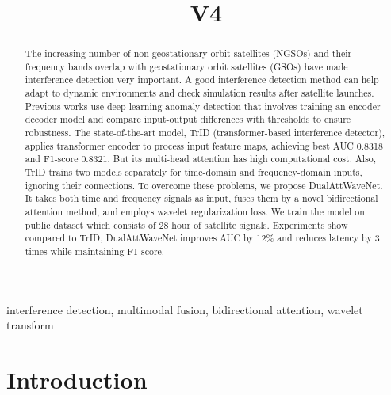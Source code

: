 \documentclass[conference]{IEEEtran}
\begin{document}
\title{V4}

\author{
}

\maketitle

\begin{abstract}
    The increasing number of non-geostationary orbit satellites (NGSOs) and their frequency bands overlap with geostationary orbit satellites (GSOs) have made interference detection very important. A good interference detection method can help adapt to dynamic environments and check simulation results after satellite launches. Previous works use deep learning anomaly detection that involves training an encoder-decoder model and compare input-output differences with thresholds to ensure robustness. The state-of-the-art model, TrID (transformer-based interference detector), applies transformer encoder to process input feature maps, achieving best AUC 0.8318 and F1-score 0.8321. But its multi-head attention has high computational cost. Also, TrID trains two models separately for time-domain and frequency-domain inputs, ignoring their connections. To overcome these problems, we propose DualAttWaveNet. It takes both time and frequency signals as input, fuses them by a novel bidirectional attention method, and employs wavelet regularization loss. We train the model on public dataset which consists of 28 hour of satellite signals. Experiments show compared to TrID, DualAttWaveNet improves AUC by 12\% and reduces latency by 3 times while maintaining F1-score. \end{abstract}

\begin{IEEEkeywords}
    interference detection, multimodal fusion, bidirectional attention, wavelet transform
\end{IEEEkeywords}

\section{Introduction}
\end{document}
